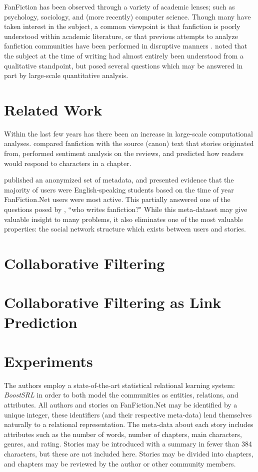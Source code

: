 \documentclass[letterpaper]{article}
\begin{document}
FanFiction has been observed through a variety of academic lenses; such as psychology, sociology, and (more recently) computer science. Though many have taken interest in the subject, a common viewpoint is that fanfiction is poorly understood within academic literature, or that previous attempts to analyze fanfiction communities have been performed in disruptive manners \cite{larsen2011fandom}. \cite{barnes2015fanfiction} noted that the subject at the time of writing had almost entirely been understood from a qualitative standpoint, but posed several questions which may be answered in part by large-scale quantitative analysis.

\section{Related Work}

Within the last few years has there been an increase in large-scale computational analyses. \cite{milli2016beyond} compared fanfiction with the source (canon) text that stories originated from, performed sentiment analysis on the reviews, and predicted how readers would respond to characters in a chapter.

\cite{yin2017no} published an anonymized set of metadata, and presented evidence that the majority of users were English-speaking students based on the time of year FanFiction.Net users were most active.  This partially answered one of the questions posed by \cite{barnes2015fanfiction}, ``who writes fanfiction?"  While this meta-dataset may give valuable insight to many problems, it also eliminates one of the most valuable properties: the social network structure which exists between users and stories.

\section{Collaborative Filtering}

\section{Collaborative Filtering as Link Prediction}

\section{Experiments}

The authors employ a state-of-the-art statistical relational learning system: \textit{BoostSRL} in order to both model the communities as entities, relations, and attributes. All authors and stories on FanFiction.Net may be identified by a unique integer, these identifiers (and their respective meta-data) lend themselves naturally to a relational representation. The meta-data about each story includes attributes such as the number of words, number of chapters, main characters, genres, and rating. Stories may be introduced with a summary in fewer than 384 characters, but these are not included here. Stories may be divided into chapters, and chapters may be reviewed by the author or other community members.
\end{document}

